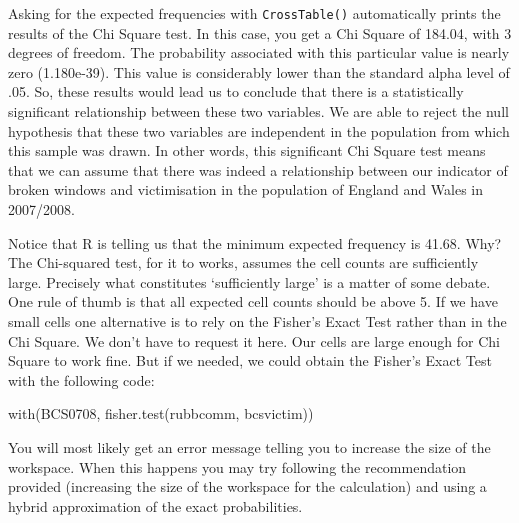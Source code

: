 \documentclass[
]{book}
\newenvironment{Shaded}{\begin{snugshade}}{\end{snugshade}}
\newcommand{\AttributeTok}[1]{\textcolor[rgb]{0.77,0.63,0.00}{#1}}
\newcommand{\ConstantTok}[1]{\textcolor[rgb]{0.00,0.00,0.00}{#1}}
\newcommand{\FloatTok}[1]{\textcolor[rgb]{0.00,0.00,0.81}{#1}}
\newcommand{\FunctionTok}[1]{\textcolor[rgb]{0.00,0.00,0.00}{#1}}
\newcommand{\NormalTok}[1]{#1}
\newcommand{\SpecialCharTok}[1]{\textcolor[rgb]{0.00,0.00,0.00}{#1}}
\begin{document}
Asking for the expected frequencies with \texttt{CrossTable()} automatically prints the results of the Chi Square test. In this case, you get a Chi Square of 184.04, with 3 degrees of freedom. The probability associated with this particular value is nearly zero (1.180e-39). This value is considerably lower than the standard alpha level of .05. So, these results would lead us to conclude that there is a statistically significant relationship between these two variables. We are able to reject the null hypothesis that these two variables are independent in the population from which this sample was drawn. In other words, this significant Chi Square test means that we can assume that there was indeed a relationship between our indicator of broken windows and victimisation in the population of England and Wales in 2007/2008.

Notice that R is telling us that the minimum expected frequency is 41.68. Why? The Chi-squared test, for it to works, assumes the cell counts are sufficiently large. Precisely what constitutes `sufficiently large' is a matter of some debate. One rule of thumb is that all expected cell counts should be above 5. If we have small cells one alternative is to rely on the Fisher's Exact Test rather than in the Chi Square. We don't have to request it here. Our cells are large enough for Chi Square to work fine. But if we needed, we could obtain the Fisher's Exact Test with the following code:

\begin{Shaded}
\begin{Highlighting}[]
\FunctionTok{with}\NormalTok{(BCS0708, }\FunctionTok{fisher.test}\NormalTok{(rubbcomm, bcsvictim))}
\end{Highlighting}
\end{Shaded}

You will most likely get an error message telling you to increase the size of the workspace. When this happens you may try following the recommendation provided (increasing the size of the workspace for the calculation) and using a hybrid approximation of the exact probabilities.

\begin{Shaded}
\end{Shaded}
\end{document}
